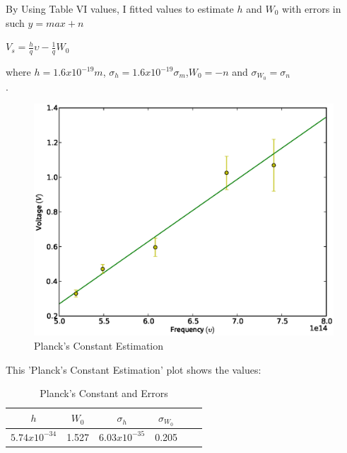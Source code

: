 \documentclass[aps,nofootinbib,onecolumn,groupedaddress,a4paper]{revtex4}
\begin{document}
By Using Table VI values, I fitted values to estimate $h$ and ${W}_{0}$ with errors in such $y=max+n$

\begin{center}
$V_s=\frac{h}{q}\upsilon-\frac{1}{q}W_0$

\end{center}

where $h=1.6x10^{-19}  m $, $\sigma_h=1.6x10^{-19}\sigma_m$,$W_0=-n$ and $\sigma_{W_0}=\sigma_n$\\.

\begin{figure}[h]
\caption{ Planck's Constant Estimation \label{rawplot}}
\includegraphics[width=1.0 \columnwidth]{planckconstant.eps}
\end{figure}

This 'Planck's Constant Estimation' plot shows the values:


\begin{table}[ht]
\caption{Planck's Constant and Errors \label{rawdata}}
\centering
\begin{tabular}{cccccc}
\\
 $h$ & $W_0$ & $\sigma_h$ & $\sigma_{W_0}$  \\
\hline
 $5.74x10^{-34}$ & 1.527 & $6.03x10^{-35}$ & 0.205 




  
\end{tabular}
\label{default}
\end{table}
\end{document}
